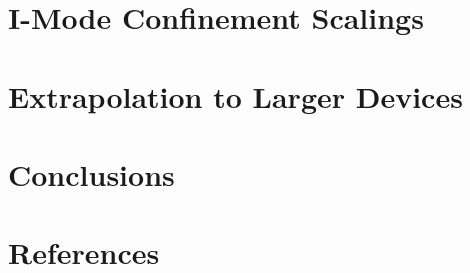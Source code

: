 \documentclass[12pt]{iopart}
\begin{document}
\section{I-Mode Confinement Scalings}\label{sec:scalings}

\section{Extrapolation to Larger Devices}\label{sec:extrap}

\section{Conclusions}\label{sec:conclusion}

\section*{References}


\end{document}
